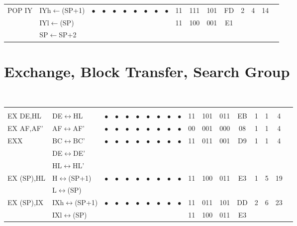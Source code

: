 \documentclass[oneside,a4paper]{book}
\begin{document}
{\begin{tabular}{llcccccccccccccccl}
		POP IY & IYh$\leftarrow$(SP+1) &
			$\bullet$ & $\bullet$ & $\bullet$ & $\bullet$ & $\bullet$ & $\bullet$ & $\bullet$ & $\bullet$ &
			11 & 111 & 101 & 
			FD & 2 & 
			4 & 14 & \\ 
		& IYl$\leftarrow$(SP) & \multicolumn{8}{c}{} & 11 & 100 & 001 & E1 & & & \\
		& SP$\leftarrow$SP+2 & \\[4pt]

		\hline

	\end{tabular}
}


\section{Exchange, Block Transfer, Search Group}

{\tt \scriptsize \setlength{\fboxsep}{0.25mm}
	\setlength{\tabcolsep}{1mm}
	\begin{tabular}{llcccccccccccccccl}
		     
		\instrheader

		& & & & & & & & & & & & & & & & & \\

		EX DE,HL & DE$\leftrightarrow$HL & 
			$\bullet$ & $\bullet$ & $\bullet$ & $\bullet$ & $\bullet$ & $\bullet$ & $\bullet$ & $\bullet$ & 
			11 & 101 & 011 & 
			EB & 1 & 
			1 & 4 & \\[4pt]

		EX AF,AF' & AF$\leftrightarrow$AF' & 
			$\bullet$ & $\bullet$ & $\bullet$ & $\bullet$ & $\bullet$ & $\bullet$ & $\bullet$ & $\bullet$ & 00 & 001 & 000
			& 08 & 1 & 1 & 4 & \\[4pt]

		EXX & BC$\leftrightarrow$BC' & 
			$\bullet$ & $\bullet$ & $\bullet$ & $\bullet$ & $\bullet$ & $\bullet$ & $\bullet$ & $\bullet$ & 
			11 & 011 & 001 & 
			D9 & 1 & 1 & 4 & \\ 
		& DE$\leftrightarrow$DE' & \\ 
		& HL$\leftrightarrow$HL' & \\[4pt]

		EX (SP),HL & H$\leftrightarrow$(SP+1) & 
			$\bullet$ & $\bullet$ & $\bullet$ & $\bullet$ & $\bullet$ & $\bullet$ & $\bullet$ & $\bullet$ & 
			11 & 100 & 011 & 
			E3 & 1 & 
			5 & 19 & \\ 
		& L$\leftrightarrow$(SP) & \\[4pt]

		EX (SP),IX & IXh$\leftrightarrow$(SP+1) & 
			$\bullet$ & $\bullet$ & $\bullet$ & $\bullet$ & $\bullet$ & $\bullet$ & $\bullet$ & $\bullet$ & 
			11 & 011 & 101 & 
			DD & 2 & 
			6 & 23 & \\ 
		& IXl$\leftrightarrow$(SP) & \multicolumn{8}{c}{} & 11 & 100 & 011 & E3 & & \\[4pt]


\end{tabular}}
\end{document}
